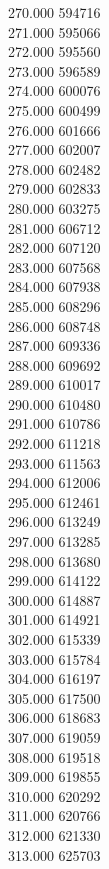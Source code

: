 { 270.000	594716 \\
 271.000	595066 \\
 272.000	595560 \\
 273.000	596589 \\
 274.000	600076 \\
 275.000	600499 \\
 276.000	601666 \\
 277.000	602007 \\
 278.000	602482 \\
 279.000	602833 \\
 280.000	603275 \\
 281.000	606712 \\
 282.000	607120 \\
 283.000	607568 \\
 284.000	607938 \\
 285.000	608296 \\
 286.000	608748 \\
 287.000	609336 \\
 288.000	609692 \\
 289.000	610017 \\
 290.000	610480 \\
 291.000	610786 \\
 292.000	611218 \\
 293.000	611563 \\
 294.000	612006 \\
 295.000	612461 \\
 296.000	613249 \\
 297.000	613285 \\
 298.000	613680 \\
 299.000	614122 \\
 300.000	614887 \\
 301.000	614921 \\
 302.000	615339 \\
 303.000	615784 \\
 304.000	616197 \\
 305.000	617500 \\
 306.000	618683 \\
 307.000	619059 \\
 308.000	619518 \\
 309.000	619855 \\
 310.000	620292 \\
 311.000	620766 \\
 312.000	621330 \\
 313.000	625703 \\
}
